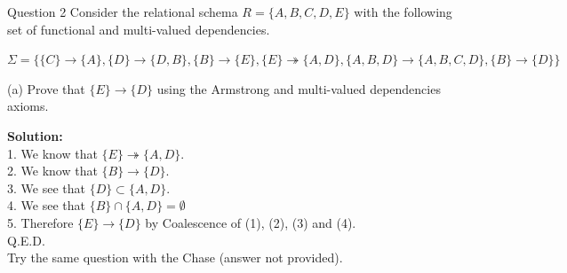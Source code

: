 \begin{frame}[fragile]{Question 2}
Consider the relational schema $R = \{A,B,C,D,E\}$ with the following set of functional and multi-valued dependencies.\\ \vspace{5pt}

$\Sigma=\{\{C\}\rightarrow\{A\}, \{D\}\rightarrow\{D,B\}, \{B\}\rightarrow\{E\},\{E\}\twoheadrightarrow\{A,D\},\{A,B,D\}\rightarrow\{A,B,C,D\},\{B\}\rightarrow\{D\}\}$\\ \vspace{5pt}

(a) Prove that $\{E\}\rightarrow\{D\}$ using the Armstrong and multi-valued dependencies axioms.\\ \vspace{5pt}

\textbf{Solution:}\\ \vspace{5pt}
1. We know that $\{E\}\twoheadrightarrow\{A,D\}$.\\ \vspace{2pt}
2. We know that $\{B\}\rightarrow\{D\}$.\\\vspace{2pt}
3. We see that $\{D\}\subset\{A,D\}$.\\\vspace{2pt}
4. We see that $\{B\}\cap \{A,D\}=\emptyset$\\\vspace{2pt}
5. Therefore $\{E\}\rightarrow\{D\}$ by Coalescence of (1), (2), (3) and (4).\\\vspace{2pt}
\hfill Q.E.D.\\\vspace{10pt}
Try the same question with the Chase (answer not provided).
\end{frame}

